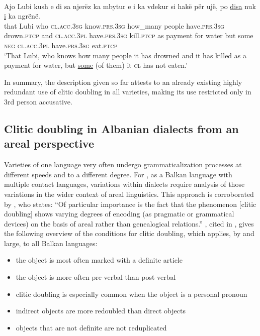 \documentclass[output=paper]{langsci/langscibook}
\begin{document}
\ea \label{example12matoshi} 
	\\
	\gll Ajo Lubi kush e di sa njerëz ka mbytur e i ka vdekur si hakë për ujë, po \uline{disa} nuk \uline{i} ka ngrënë.\\
	that Lubi who \textsc{cl.acc.3sg} know\textsc{.prs.3sg} how\_many people have\textsc{.prs.3sg} drown.\textsc{ptcp} and \textsc{cl.acc.3pl} have\textsc{.prs.3sg} kill.\textsc{ptcp} as payment for water but some \textsc{neg} \textsc{cl.acc.3pl} have\textsc{.prs.3sg} eat.\textsc{ptcp} \\
	\glt ‘That Lubi, who knows how many people it has drowned and it has killed as a payment for water, but \uline{some} (of them) it \textsc{cl} has not eaten.’
 \z

In summary, the description given so far attests to an already existing highly redundant use of clitic doubling in all  varieties, making its use restricted only in 3rd person accusative. 

\subsection{Clitic doubling in Albanian dialects from an areal perspective}

Varieties of one language very often undergo grammaticalization processes at different speeds and to a different degree. For , as a Balkan language with multiple contact languages, variations within dialects require analysis of those variations in the wider context of areal linguistics. This approach is corroborated by \citet[36]{Friedman2008}, who states: \enquote{Of particular importance is the fact that the phenomenon [clitic doubling] shows varying degrees of encoding (as pragmatic or grammatical devices) on the basis of areal rather than genealogical relations.} \citet[110]{Assenova2002}, cited in \citet[40]{Friedman2008}, gives the following overview of the conditions for clitic doubling, which applies, by and large, to all Balkan languages:

\begin{itemize}
\item the object is most often marked with a definite article
\item the object is more often pre-verbal than post-verbal
\item clitic doubling is especially common when the object is a personal pronoun
\item indirect objects are more redoubled than direct objects
\item objects that are not definite are not reduplicated
\end{itemize}
\end{document}
